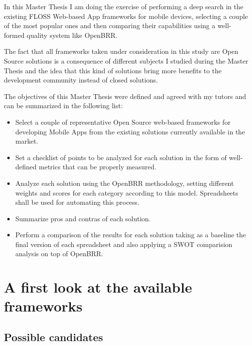 \documentclass[a4paper,12pt]{book}
\begin{document}
In this Master Thesis I am doing the exercise of performing a deep search in the existing FLOSS Web-based App frameworks for mobile devices, selecting a couple of the most popular ones and then comparing their capabilities using a well-formed quality system like OpenBRR.


The fact that all frameworks taken under consideration in this study are Open Source solutions is a consequence of different subjects I studied during the Master Thesis and the idea that this kind of solutions bring more benefits to the development community instead of closed solutions.

The objectives of this Master Thesis were defined and agreed with my tutors and can be summarized in the following list:

\begin{itemize}
\item Select a couple of representative Open Source web-based frameworks for developing Mobile Apps from the existing solutions currently available in the market.
\item Set a checklist of points to be analyzed for each solution in the form of well-defined metrics that can be properly measured.
\item Analyze each solution using the OpenBRR methodology, setting different weights and scores for each category according to this model. Spreadsheets shall be used for automating this process.
\item Summarize pros and contras of each solution.
\item Perform a comparison of the results for each solution taking as a baseline the final version of each spreadsheet and also applying a SWOT comparision analysis on top of OpenBRR.
\end{itemize}


\chapter{A first look at the available frameworks}
\label{chap:overview}

\section{Possible candidates}
\label{sec:candidates}
 
\end{document}
